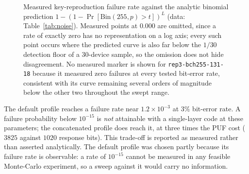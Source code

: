 \documentclass[11pt,a4paper]{article}
\begin{document}
\begin{figure}[tp]
\centering
{}
\caption{Measured key-reproduction failure rate against the analytic binomial
prediction $1-(1-\Pr[\mathrm{Bin}(255,p)>t])^{L}$ (data: Table~\ref{tab:noise}).
Measured points at $0.000$ are omitted, since a rate of exactly zero has no
representation on a log axis; every such point occurs where the predicted
curve is also far below the $1/30$ detection floor of a $30$-device sample, so
the omission does not hide disagreement. No measured marker is shown for
\texttt{rep3-bch255-131-18} because it measured zero failures at every tested
bit-error rate, consistent with its curve remaining several orders of
magnitude below the other two throughout the swept range.}
\label{fig:reliability}
\end{figure}

The default profile reaches a failure rate near $1.2\times10^{-3}$ at $3\%$
bit-error rate. A failure probability below $10^{-15}$ is \emph{not} attainable
with a single-layer code at these parameters; the concatenated profile does reach
it, at three times the PUF cost ($3825$ against $1020$ response bits). This
trade-off is reported as measured rather than asserted analytically. The default
profile was chosen partly because its failure rate is observable: a rate of
$10^{-15}$ cannot be measured in any feasible Monte-Carlo experiment, so a sweep
against it would carry no information.
\end{document}
